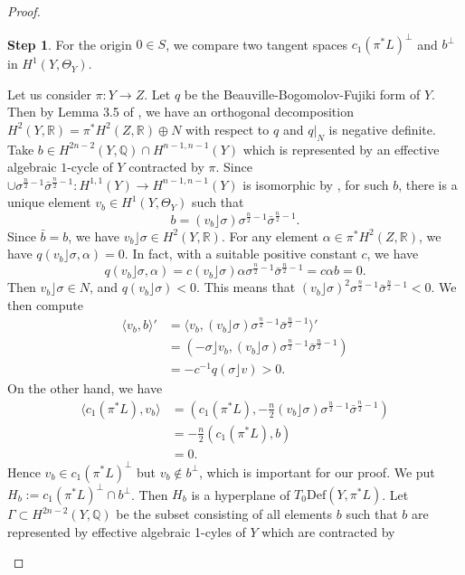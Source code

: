 \documentclass[12pt,a4paper]{amsart}
\theoremstyle{remark}
\theoremstyle{definition}
\newtheorem{Step}{Step}
\def\Q{\mathbb{Q}}
\begin{document}
\begin{proof}
\begin{Step}
For the origin $0 \in S$,  
we compare two tangent spaces  $c_1(\pi^*L)^{\perp}$ and  
$b^{\perp}$ in $H^1(Y, \Theta_Y)$. 


Let us consider $\pi: Y \to Z$. Let $q$ be the Beauville-Bogomolov-Fujiki form of $Y$. Then by Lemma 3.5 of 
\cite{BakkerLehn}, 
we have an orthogonal decomposition  $H^2(Y, \mathbb{R}) = \pi^*H^2(Z, \mathbb{R}) \oplus N$ with respect to $q$ and 
$q\vert _N$ is negative definite.
Take $b\in H^{2n-2}(Y,\Q)\cap H^{n-1,n-1}(Y)$ which is represented by an effective algebraic $1$-cycle of $Y$ contracted by $\pi$. 
Since $\cup 
\sigma^{\frac{n}{2}-1}
\bar{\sigma}^{\frac{n}{2}-1}\colon H^{1,1}(Y)\to H^{n-1,n-1}(Y)$ is 
isomorphic by \cite{Fujiki 2}, 
for such $b$, there is a unique element $v_b \in H^1(Y, \Theta_Y)$ such that 
$$b = (v_b \rfloor \sigma) \sigma^{\frac{n}{2}-1}\bar{\sigma}^{\frac{n}{2}-1}
.$$ 
Since $\bar{b} = b$,    
we have $v_b \rfloor \sigma \in H^2(Y, \mathbb{R})$. 
For any element $\alpha \in \pi^*H^2(Z, \mathbb{R})$, we have $q(v_b \rfloor \sigma, \alpha) = 0$. 
In fact, with a suitable positive constant $c$, we have $$q(v_b \rfloor \sigma, \alpha) = c (v_b \rfloor \sigma) \alpha  
\sigma^{\frac{n}{2}-1}\bar{\sigma}^{\frac{n}{2}-1} = c \alpha b = 0.$$
Then $v_b \rfloor \sigma \in N$, and $q(v_b \rfloor \sigma) < 0$. This means that 
$(v_b \rfloor \sigma)^2 \sigma^{\frac{n}{2}-1}\bar{\sigma}^{\frac{n}{2}-1} < 0$.  
We then compute 
\begin{align*}
\langle v_b, b \rangle' &= \langle v_b, (v_b \rfloor \sigma) \sigma^{\frac{n}{2}-1}\bar{\sigma}^{\frac{n}{2}-1} \rangle'\\
&= (-\sigma \rfloor v_b, (v_b \rfloor \sigma) \sigma^{\frac{n}{2}-1}\bar{\sigma}^{\frac{n}{2}-1}) \\
&= - c^{-1}q(\sigma \rfloor v) > 0.
\end{align*}
On the other hand, we have 
\begin{align*}
\langle c_1(\pi^*L),  v_b \rangle &= (c_1(\pi^*L), -\frac{n}{2}(v_b \rfloor \sigma) \sigma^{\frac{n}{2}-1}\bar{\sigma}^{\frac{n}{2}-1}) \\ &=  - \frac{n}{2} (c_1(\pi^*L), b) \\ &= 0.
\end{align*}
Hence $v_b \in c_1(\pi^*L)^{\perp}$ but $v_b \notin b^{\perp}$, 
which is important for our proof. 
We put $H_b := c_1(\pi^*L)^{\perp} \cap b^{\perp}$. 
Then $H_b$ is a hyperplane of $T_0\mathrm{Def}(Y, \pi^*L)$.  Let $\Gamma  \subset H^{2n-2}(Y, \mathbb{Q})$ be the subset 
consisting of all elements $b$ such that $b$ are represented by effective algebraic 1-cyles of $Y$ which are contracted by 

\end{Step}
\end{proof}
\end{document}
